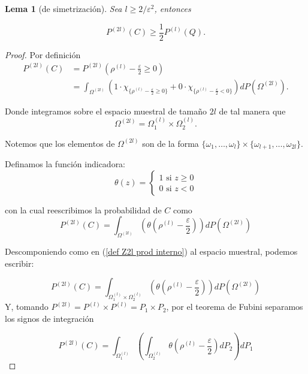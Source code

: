 \documentclass{report}
\newtheorem{lem}{Lema}[section]
\begin{document}
\begin{lem} [de simetrización]
    Sea \( l \geq 2 / \varepsilon^2 \), entonces

    \[
    P^{(2l)}(C) \geq \frac{1}{2} P^{(l)}(Q).
    \]
\end{lem}
\begin{proof}
Por definición
\begin{equation*}
\begin{aligned}
P^{(2l)}(C) &= P^{(2l)}\left(\rho^{(l)}-\frac{\varepsilon}{2}\geq 0\right) \\
&= \int_{\Omega^{(2l)}} \left( 1 \cdot \chi_{\{\rho^{(l)}-\frac{\varepsilon}{2}\geq 0\}}
+ 0 \cdot \chi_{\{\rho^{(l)}-\frac{\varepsilon}{2}< 0\}} \right) dP(\Omega^{(2l)}).
\end{aligned}
\end{equation*}

Donde integramos sobre el espacio muestral de tamaño $2l$ de tal manera que
\begin{equation}
    \Omega^{(2l)} = \Omega_1^{(l)}\times \Omega_2^{(l)}.  \label{def Z2l prod interno}
\end{equation}

Notemos que los elementos de $\Omega^{(2l)}$ son de la forma $ \{\omega_1,\ldots,\omega_l\} \times \{\omega_{l+1},\dots,\omega_{2l}\}$.

Definamos la función indicadora:
\[
\theta(z)=\begin{cases}
    1 \text{ si } z\geq 0 \\
    0 \text{ si } z< 0
\end{cases}
\]

con la cual reescribimos la probabilidad de $C$ como
\begin{equation}
P^{(2l)}(C) = \int_{\Omega^{(2l)}} \left( \theta\left(\rho^{(l)}-\frac{\varepsilon}{2}\right)\right) dP(\Omega^{(2l)})
\end{equation}

Descomponiendo como en (\ref{def Z2l prod interno}) al espacio muestral, podemos escribir:

\[
P^{(2l)}(C) = \int_{\Omega_1^{(l)}\times \Omega_2^{(l)}} \left( \theta\left(\rho^{(l)}-\frac{\varepsilon}{2}\right)\right) dP(\Omega^{(2l)})
\]
Y, tomando $P^{(2l)}=P^{(l)}\times P^{(l)} = P_1\times P_2$, por el teorema de Fubini separamos los signos de integración

\[
P^{(2l)}(C) = \int_{\Omega_1^{(l)}} \left( \int_{ \Omega_2^{(l)}}  \theta\left(\rho^{(l)}-\frac{\varepsilon}{2}\right) dP_2\right) dP_1
\]


\end{proof}
\end{document}
